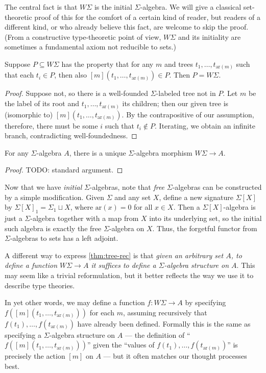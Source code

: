 \documentclass{book}
\def\ay{\mathrm{ar}}
\def\sig{\Sigma}
\def\act#1{[#1]}
\begin{document}
The central fact is that $W\sig$ is the initial $\sig$-algebra.
We will give a classical set-theoretic proof of this for the comfort of a certain kind of reader, but readers of a different kind, or who already believe this fact, are welcome to skip the proof.
(From a constructive type-theoretic point of view, $W\sig$ and its initiality are sometimes a fundamental axiom not reducible to sets.)

\begin{thm}\label{thm:tree-ind}
  Suppose $P\subseteq W\sig$ has the property that for any $m$ and trees $t_1,\dots,t_{\ay(m)}$ such that each $t_i\in P$, then also $\act m(t_1,\dots,t_{\ay(m)})\in P$.
  Then $P= W\sig$.
\end{thm}
\begin{proof}
  Suppose not, so there is a well-founded $\sig$-labeled tree not in $P$.
  Let $m$ be the label of its root and $t_1,\dots,t_{\ay(m)}$ its children; then our given tree is (isomorphic to) $\act m(t_1,\dots,t_{\ay(m)})$.
  By the contrapositive of our assumption, therefore, there must be some $i$ such that $t_i\notin P$.
  Iterating, we obtain an infinite branch, contradicting well-foundedness.
\end{proof}

\begin{thm}\label{thm:tree-rec}
  For any $\sig$-algebra $A$, there is a unique $\sig$-algebra morphism $W\sig \to A$.
\end{thm}
\begin{proof}
  TODO: standard argument.
\end{proof}

Now that we have \emph{initial} $\sig$-algebras, note that \emph{free} $\sig$-algebras can be constructed by a simple modification.
Given $\sig$ and any set $X$, define a new signature $\sig[X]$ by $\sig[X]_1 = \sig_1 \sqcup X$, where $\ay(x)=0$ for all $x\in X$.
Then a $\sig[X]$-algebra is just a $\sig$-algebra together with a map from $X$ into its underlying set, so the initial such algebra is exactly the free $\sig$-algebra on $X$.
Thus, the forgetful functor from $\sig$-algebras to sets has a left adjoint.

A different way to express \cref{thm:tree-rec} is that \emph{given an arbitrary set $A$, to define a function $W\sig \to A$ it suffices to define a $\sig$-algebra structure on $A$}.
This may seem like a trivial reformulation, but it better reflects the way we use it to describe type theories.

In yet other words, we may define a function $f:W\sig \to A$ by specifying $f(\act m(t_1,\dots,t_{\ay(m)}))$ for each $m$, assuming recursively that $f(t_1),\dots,f(t_{\ay(m)})$ have already been defined.
Formally this is the same as specifying a $\sig$-algebra structure on $A$ --- the definition of ``$f(\act m(t_1,\dots,t_{\ay(m)}))$'' given the ``values of $f(t_1),\dots,f(t_{\ay(m)})$'' is precisely the action $\act m$ on $A$ --- but it often matches our thought processes best.
\end{document}
